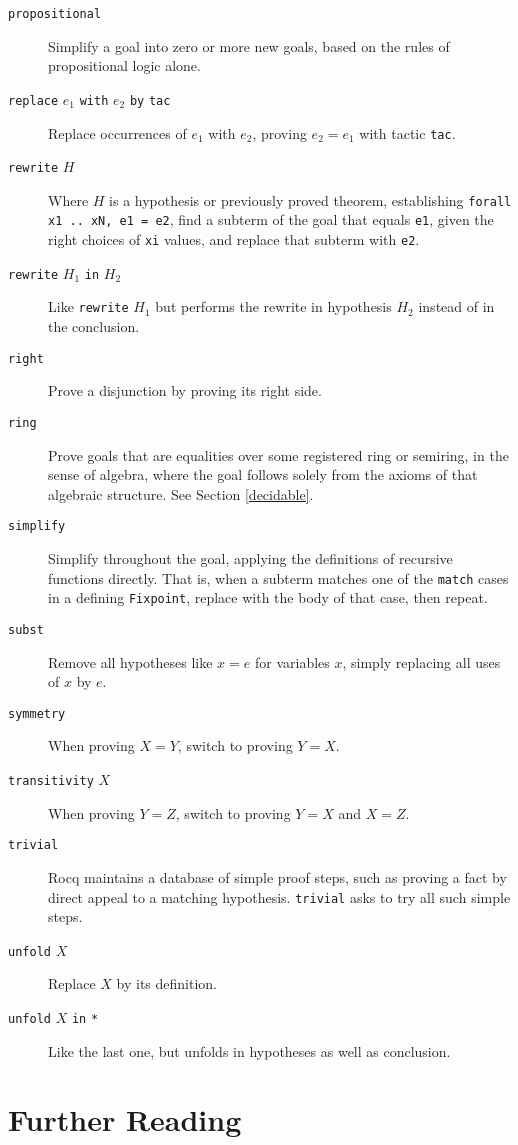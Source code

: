 \documentclass{amsbook}
\theoremstyle{definition}
\theoremstyle{remark}
\numberwithin{section}{chapter}
\numberwithin{equation}{chapter}
\begin{document}
\begin{description}
  \item[\texttt{propositional}] Simplify a goal into zero or more new goals, based on the rules of propositional logic alone.
  \item[\texttt{replace} $e_1$ \texttt{with} $e_2$ \texttt{by} \texttt{tac}] Replace occurrences of $e_1$ with $e_2$, proving $e_2 = e_1$ with tactic \texttt{tac}.
  \item[\texttt{rewrite} $H$] Where $H$ is a hypothesis or previously proved theorem, establishing \texttt{forall x1 .. xN, e1 = e2}, find a subterm of the goal that equals \texttt{e1}, given the right choices of \texttt{xi} values, and replace that subterm with \texttt{e2}.
  \item[\texttt{rewrite} $H_1$ \texttt{in} $H_2$] Like \texttt{rewrite} $H_1$ but performs the rewrite in hypothesis $H_2$ instead of in the conclusion.
  \item[\texttt{right}] Prove a disjunction by proving its right side.
  \item[\texttt{ring}] Prove goals that are equalities over some registered ring or semiring, in the sense of algebra, where the goal follows solely from the axioms of that algebraic structure.  See Section \ref{decidable}.
  \item[\texttt{simplify}] Simplify throughout the goal, applying the definitions of recursive functions directly.  That is, when a subterm matches one of the \texttt{match} cases in a defining \texttt{Fixpoint}, replace with the body of that case, then repeat.
  \item[\texttt{subst}] Remove all hypotheses like $x = e$ for variables $x$, simply replacing all uses of $x$ by $e$.
  \item[\texttt{symmetry}] When proving $X = Y$, switch to proving $Y = X$.
  \item[\texttt{transitivity} $X$] When proving $Y = Z$, switch to proving $Y = X$ and $X = Z$.
  \item[\texttt{trivial}] Rocq maintains a database of simple proof steps, such as proving a fact by direct appeal to a matching hypothesis.  \texttt{trivial} asks to try all such simple steps.
  \item[\texttt{unfold} $X$] Replace $X$ by its definition.
  \item[\texttt{unfold} $X$ \texttt{in} \texttt{*}] Like the last one, but unfolds in hypotheses as well as conclusion.
\end{description}

\section{Further Reading}
\end{document}
